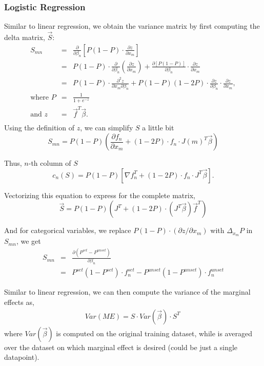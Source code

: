 \subsubsection*{Logistic Regression}
Similar to linear regression, we obtain the variance matrix by first computing
the delta matrix, $\vec{S}$:
\begin{eqnarray*}
  S_{mn} &=& \frac{\partial}{\partial\beta_n} \left[P (1- P)
    \cdot \frac{\partial z}{\partial x_m}\right]\\
  &=& P (1- P) \cdot \frac{\partial}{\partial\beta_n}\left(\frac{\partial z}{\partial x_m}\right)
    + \frac{\partial \left[P (1- P)\right]}{\partial\beta_n} \cdot \frac{\partial z}{\partial x_m}\\
  &=& P(1-P)\cdot\frac{\partial^2 z}{\partial x_m\partial\beta_n}
    + P(1-P)(1-2P) \cdot \frac{\partial z}{\partial \beta_n} \cdot \frac{\partial z}{\partial x_m},\\
  \text{where } P &=& \frac{1}{1 + e^{-z}} \\
    \text{and } z &=& \vec{f}^T \vec{\beta}. \\
\end{eqnarray*}
Using the definition of $z$, we can simplify $S$ a little bit
\begin{equation*}
    S_{mn} = P(1-P)\left(\frac{\partial f_n}{\partial x_m} + (1-2P)\cdot f_n \cdot J(m)^T \vec{\beta} \right)
\end{equation*}

Thus, $n$-th column of $S$
$$
c_n(S) = P(1-P)\left[\nabla f_n^T + (1-2P) \cdot f_n \cdot J^T \vec{\beta}\right].
$$

Vectorizing this equation to express for the complete matrix,
\begin{equation*}
     \vec{S} = P(1-P) \left(J^T +
                (1-2P) \cdot (J^T \vec{\beta}) \vec{f}^T \right)
 \end{equation*}

And for categorical variables, we replace $P(1-P)\cdot(\partial z/\partial x_m)$
with $\Delta_{x_m}P$ in $S_{mn}$, we get
\begin{eqnarray*}
  S_{mn} &=& \frac{\partial(P^{set}-P^{unset})}{\partial\beta_n}  \\
         &=& P^{set} (1 - P^{set}) \cdot f_n^{set} - P^{unset} (1 - P^{unset}) \cdot f_n^{unset}
\end{eqnarray*}

Similar to linear regression, we can then compute the variance of the marginal effects as,
\begin{align*}
  Var(\mathit{ME}) = S \cdot Var(\vec{\beta})\cdot S^T\,
\end{align*}
where $Var(\vec{\beta})$ is computed on the original training dataset, while
 is averaged over the dataset on which marginal effect is desired
(could be just a single datapoint).

